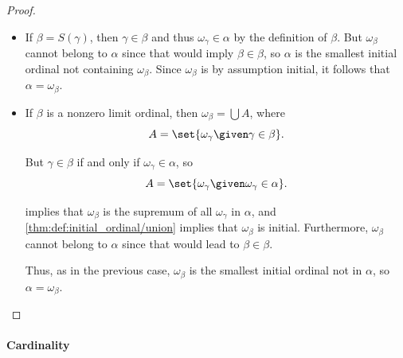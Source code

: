 \begin{proof}
\begin{itemize}
    It follows that \( \beta = \varnothing \) implies that \( \alpha = \omega_0 = \omega_\beta \).

    \item If \( \beta = S(\gamma) \), then \( \gamma \in \beta \) and thus \( \omega_\gamma \in \alpha \) by the definition of \( \beta \). But \( \omega_\beta \) cannot belong to \( \alpha \) since that would imply \( \beta \in \beta \), so \( \alpha \) is the smallest initial ordinal not containing \( \omega_\beta \). Since \( \omega_\beta \) is by assumption initial, it follows that \( \alpha = \omega_\beta \).

    \item If \( \beta \) is a nonzero limit ordinal, then \( \omega_\beta = \bigcup A \), where
    \begin{equation*}
      A = \set{ \omega_\gamma \given \gamma \in \beta }.
    \end{equation*}

    But \( \gamma \in \beta \) if and only if \( \omega_\gamma \in \alpha \), so
    \begin{equation*}
      A = \set{ \omega_\gamma \given \omega_\gamma \in \alpha }.
    \end{equation*}

     implies that \( \omega_\beta \) is the supremum of all \( \omega_\gamma \) in \( \alpha \), and \cref{thm:def:initial_ordinal/union} implies that \( \omega_\beta \) is initial. Furthermore, \( \omega_\beta \) cannot belong to \( \alpha \) since that would lead to \( \beta \in \beta \).

    Thus, as in the previous case, \( \omega_\beta \) is the smallest initial ordinal not in \( \alpha \), so \( \alpha = \omega_\beta \).
  \end{itemize}
\end{proof}

\paragraph{Cardinality}

